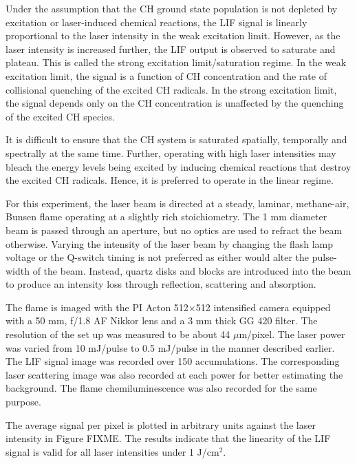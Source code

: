 Under the assumption that the CH ground state population is not depleted by excitation or laser-induced chemical reactions, the LIF signal is linearly proportional to the laser intensity in the weak excitation limit.
However, as the laser intensity is increased further, the LIF output is observed to saturate and plateau.
This is called the strong excitation limit/saturation regime.
In the weak excitation limit, the signal is a function of CH concentration and the rate of collisional quenching of the excited CH radicals.
In the strong excitation limit, the signal depends only on the CH concentration is unaffected by the quenching of the excited CH species.

It is difficult to ensure that the CH system is saturated spatially, temporally and spectrally at the same time.
Further, operating with high laser intensities may bleach the energy levels being excited by inducing chemical reactions that destroy the excited CH radicals.
Hence, it is preferred to operate in the linear regime.

For this experiment, the laser beam is directed at a steady, laminar, methane-air, Bunsen flame operating at a slightly rich stoichiometry.
The 1 mm diameter beam is passed through an aperture, but no optics are used to refract the beam otherwise.
Varying the intensity of the laser beam by changing the flash lamp voltage or the Q-switch timing is not preferred as either would alter the pulse-width of the beam.
Instead, quartz disks and blocks are introduced into the beam to produce an intensity loss through reflection, scattering and absorption.

The flame is imaged with the PI Acton 512\(\times\)512 intensified camera equipped with a 50 mm, f/1.8 AF Nikkor lens and a 3 mm thick GG 420 filter.
The resolution of the set up was measured to be about 44 \(\mu\)m/pixel.
The laser power was varied from 10 mJ/pulse to 0.5 mJ/pulse in the manner described earlier.
The LIF signal image was recorded over 150 accumulations.
The corresponding laser scattering image was also recorded at each power for better estimating the background.
The flame chemiluminescence was also recorded for the same purpose.

The average signal per pixel is plotted in arbitrary units against the laser intensity in Figure FIXME.
The results indicate that the linearity of the LIF signal is valid for all laser intensities under 1 J/cm\(^2\).

